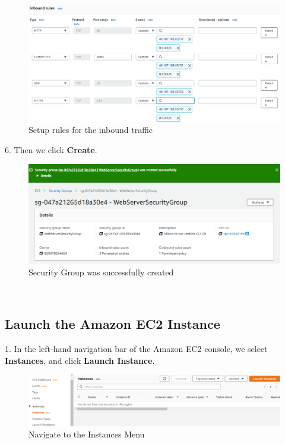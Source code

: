 \documentclass[12pt,a4paper,twoside]{article}
\begin{document}
\begin{figure}[H]
    \centering
        \includegraphics[width=15cm]{images-aws/2-inbound-rules.png}
        \caption{Setup rules for the inbound traffic}
\end{figure}


6. Then we click \textbf{Create}.


\begin{figure}[H]
    \centering
        \includegraphics[width=15cm]{images-aws/3-create-sg-created.png}
        \caption{Security Group was successfully created}
\end{figure}


~\newpage

\subsection{Launch the Amazon EC2 Instance}


1. In the left-hand navigation bar of the Amazon EC2 console, we select \textbf{Instances}, and click \textbf{Launch Instance}.


\begin{figure}[H]
    \centering
        \includegraphics[width=15cm]{images-aws/4-instances.png}
        \caption{Navigate to the Instances Menu}
\end{figure}
\end{document}
